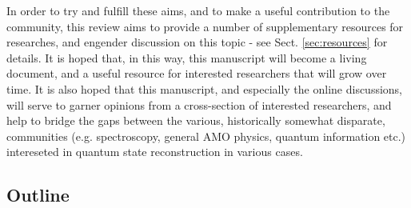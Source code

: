 
In order to try and fulfill these aims, and to make a useful contribution to the community, this review aims to provide a number of supplementary resources for researches, and engender discussion on this topic - see Sect. \ref{sec:resources} for details.
It is hoped that, in this way, this manuscript will become a living document, and a useful resource for interested researchers that will grow over time. It is also hoped that this manuscript, and especially the online discussions, will serve  to garner opinions from a cross-section of interested researchers, and help to bridge the gaps between the various, historically somewhat disparate, communities (e.g. spectroscopy, general AMO physics, quantum information etc.) intereseted in quantum state reconstruction in various cases.

\subsection{Outline}

